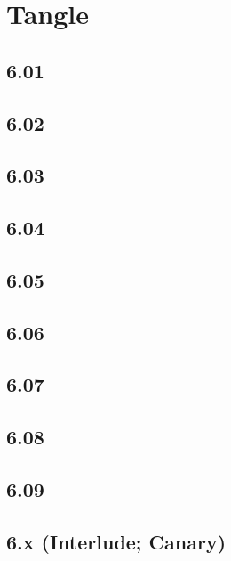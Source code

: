 \part{Tangle}
 \chapter{6.01}
 \chapter{6.02}
 \chapter{6.03}
 \chapter{6.04}
 \chapter{6.05}
 \chapter{6.06}
 \chapter{6.07}
 \chapter{6.08}
 \chapter{6.09}
 \chapter{6.x (Interlude; Canary)}











